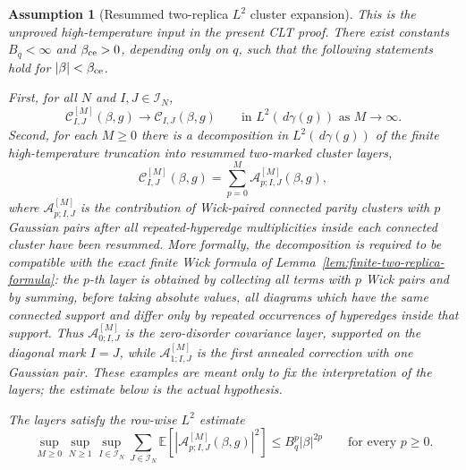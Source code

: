 \documentclass[11pt]{article}
\newtheorem{assumption}[theorem]{Assumption}
\newcommand{\E}{\mathbb{E}}
\newcommand{\calI}{\mathcal{I}}
\newcommand{\dd}{\,d}
\begin{document}
\begin{assumption}[Resummed two-replica $L^2$ cluster expansion]
  \label{ass:two-replica-cluster-expansion}
  This is the unproved high-temperature input in the present CLT proof.
  There exist constants $B_q<\infty$ and $\beta_{\rm ce}>0$, depending only on
  $q$, such that the following statements hold for $|\beta|<\beta_{\rm ce}$.

  First, for all $N$ and $I,J\in\calI_N$,
  \begin{equation}\label{eq:cluster-convergence}
    \mathcal C^{[M]}_{I,J}(\beta,g)
    \to
    \mathcal C_{I,J}(\beta,g)
    \qquad
    \text{in }L^2(\dd\gamma(g))
    \text{ as }M\to\infty.
  \end{equation}
  Second, for each $M\geq0$ there is a decomposition in $L^2(\dd\gamma(g))$
  of the finite high-temperature truncation into resummed two-marked cluster
  layers,
  \begin{equation}\label{eq:resummed-layer-decomposition}
    \mathcal C^{[M]}_{I,J}(\beta,g)
    =
    \sum_{p=0}^M
    \mathcal A^{[M]}_{p;I,J}(\beta,g),
  \end{equation}
  where $\mathcal A^{[M]}_{p;I,J}$ is the contribution of Wick-paired connected
  parity clusters with $p$ Gaussian pairs after all repeated-hyperedge
  multiplicities inside each connected cluster have been resummed.  More
  formally, the decomposition is required to be compatible with the exact
  finite Wick formula of Lemma~\ref{lem:finite-two-replica-formula}: the
  $p$-th layer is obtained by collecting all terms with $p$ Wick pairs and by
  summing, before taking absolute values, all diagrams which have the same
  connected support and differ only by repeated occurrences of hyperedges
  inside that support.  Thus $\mathcal A^{[M]}_{0;I,J}$ is the zero-disorder
  covariance layer, supported on the diagonal mark $I=J$, while
  $\mathcal A^{[M]}_{1;I,J}$ is the first annealed correction with one Gaussian
  pair.  These examples are meant only to fix the interpretation of the layers;
  the estimate below is the actual hypothesis.

  The layers satisfy the row-wise $L^2$ estimate
  \begin{equation}\label{eq:resummed-layer-bound}
    \sup_{M\geq0}
    \sup_{N\geq1}
    \sup_{I\in\calI_N}
    \sum_{J\in\calI_N}
    \E\left[
      \left|
        \mathcal A^{[M]}_{p;I,J}(\beta,g)
      \right|^2
    \right]
    \leq
    B_q^p|\beta|^{2p}
    \qquad
    \text{for every }p\geq0.
  \end{equation}
\end{assumption}
\end{document}
